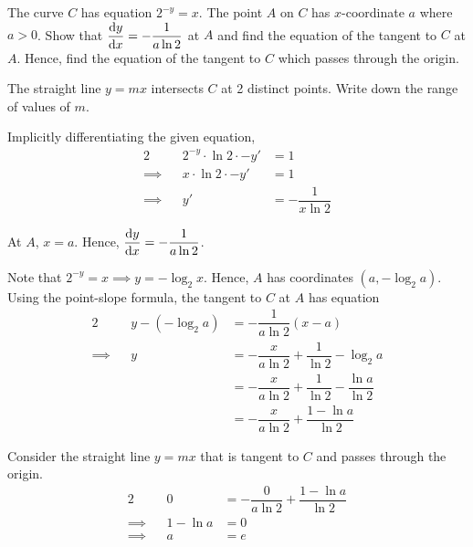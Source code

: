 \documentclass{echw}
\begin{document}

    \problem{}
        The curve $C$ has equation $2^{-y} = x$. The point $A$ on $C$ has $x$-coordinate $a$ where $a > 0$. Show that $\dfrac{\mathrm{d} y}{\mathrm{d} x} = -\dfrac1{a\ln2}$ at $A$ and find the equation of the tangent to $C$ at $A$. Hence, find the equation of the tangent to $C$ which passes through the origin.
        
        The straight line $y = mx$ intersects $C$ at 2 distinct points. Write down the range of values of $m$.

    \solution
        Implicitly differentiating the given equation,
        \begin{alignat*}{2}
            &&2^{-y} \cdot \ln 2 \cdot -y' &= 1\\
            \implies&&x \cdot \ln 2 \cdot -y' &= 1\\
            \implies&&y' &= -\dfrac{1}{x \ln 2}
        \end{alignat*}

        At $A$, $x = a$. Hence, $\dfrac{\mathrm{d} y}{\mathrm{d} x} = -\dfrac{1}{a \ln 2}$.

        \medskip

        Note that $2^{-y} = x \implies y = -\log_2{x}$. Hence, $A$ has coordinates $(a, -\log_2{a})$. Using the point-slope formula, the tangent to $C$ at $A$ has equation
                \begin{alignat*}{2}
            &&y-(-\log_2{a}) &= -\dfrac1{a\ln2}(x-a)\\
            \implies&&y &= -\dfrac{x}{a\ln2} + \dfrac1{\ln2} - \log_2{a}\\
            && &= -\dfrac{x}{a\ln2} + \dfrac1{\ln2} - \dfrac{\ln a}{\ln 2}\\
            && &= -\dfrac{x}{a\ln2} + \dfrac{1 - \ln a}{\ln2}
        \end{alignat*}


        Consider the straight line $y = mx$ that is tangent to $C$ and passes through the origin.
        \begin{alignat*}{2}
            &&0 &= -\dfrac{0}{a\ln2} + \dfrac{1 - \ln a}{\ln2}\\
            \implies&&1-\ln a &= 0\\
            \implies&&a &= e
        \end{alignat*}
\end{document}
